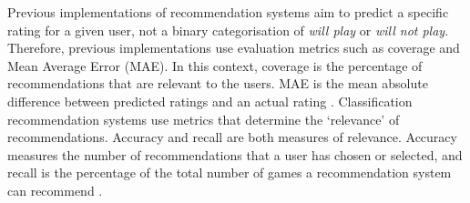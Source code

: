 Previous implementations of recommendation systems aim to predict a specific rating for a given user, not a binary categorisation of \textit{will play} or \textit{will not play}. Therefore, previous implementations use evaluation metrics such as coverage and Mean Average Error (MAE). In this context, coverage is the percentage of recommendations that are relevant to the users. MAE is the mean absolute difference between predicted ratings and an actual rating \cite{gupta2015performance}. Classification recommendation systems use metrics that determine the `relevance' of recommendations. Accuracy and recall are both measures of relevance. Accuracy measures the number of recommendations that a user has chosen or selected, and recall is the percentage of the total number of games a recommendation system can recommend \cite{herlocker2004evaluating}.